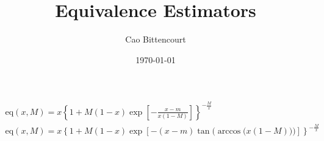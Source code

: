 \documentclass{article}
\title{Equivalence Estimators}
\author{Cao Bittencourt}
\date{\today}
\begin{document}
    \begin{gather}
        \text{eq}(x,M) = x \left\{ 
            1 + M(1-x)\exp\left[
                -\frac{x-m}{x(1-M)}
            \right]
        \right\} ^ {-\frac{M}{x}}\\
        \text{eq}(x,M) = x \left\{ 
            1 + M(1-x)\exp\left[
                -(x-m)
                \tan\bigg(
                    \arccos\big(
                        x(1-M)
                    \big)
                \bigg)
            \right]
        \right\} ^ {-\frac{M}{x}}
    \end{gather}
\end{document}
